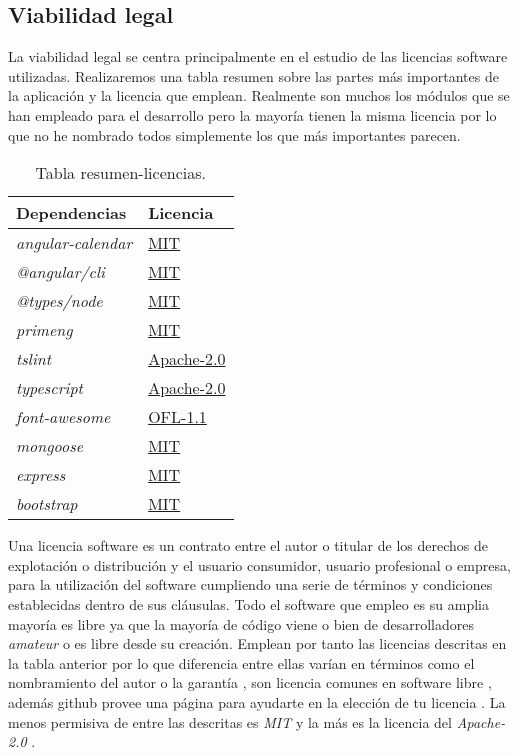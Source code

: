 \subsection{Viabilidad legal}\label{viabilidad-legal}
La viabilidad legal se centra principalmente en el estudio de las licencias software utilizadas. Realizaremos una tabla resumen sobre las partes más importantes de la aplicación y la licencia que emplean. Realmente son muchos los módulos que se han empleado para el desarrollo pero la mayoría tienen la misma licencia por lo que no he nombrado todos simplemente los que más importantes parecen. 

\begin{table}[H]
\begin{center}
\begin{tabular}{|l|l|}
\hline
Dependencias & Licencia \\
\hline \hline
\emph{angular-calendar} & \href{https://opensource.org/licenses/MIT}{MIT}\\ \hline
\emph{@angular/cli} & \href{https://opensource.org/licenses/MIT}{MIT}\\ \hline
\emph{@types/node} & \href{https://opensource.org/licenses/MIT}{MIT}\\ \hline
\emph{primeng} & \href{https://opensource.org/licenses/MIT}{MIT}\\ \hline
\emph{tslint} & \href{https://opensource.org/licenses/Apache-2.0}{Apache-2.0}\\ \hline
\emph{typescript} & \href{https://opensource.org/licenses/Apache-2.0}{Apache-2.0}\\ \hline
\emph{font-awesome} & \href{https://opensource.org/licenses/OFL-1.1}{OFL-1.1}\\ \hline
\emph{mongoose} & \href{https://opensource.org/licenses/MIT}{MIT}\\ \hline
\emph{express} & \href{https://opensource.org/licenses/MIT}{MIT}\\ \hline
\emph{bootstrap} & \href{https://opensource.org/licenses/MIT}{MIT}\\ \hline

\end{tabular}
\caption{Tabla resumen-licencias.}
\label{tabla:licencias}
\end{center}
\end{table}



Una licencia software es un contrato entre el autor o titular de los derechos de explotación o distribución y el usuario consumidor, usuario profesional o empresa, para la utilización del software cumpliendo una serie de términos y condiciones establecidas dentro de sus cláusulas. Todo el software que empleo es su amplia mayoría es libre ya que la mayoría de código viene o bien de desarrolladores \emph{amateur} o es libre desde su creación. Emplean por tanto las licencias descritas en la tabla anterior por lo que diferencia entre ellas varían en términos como el nombramiento del autor o la garantía , son licencia comunes en software libre \cite{githublicense} , además github provee una página para ayudarte en la elección de tu licencia \citep{githubchoose}. La menos permisiva de entre las descritas es \emph{MIT} \citep{mit}  y la más es la licencia del  \emph{Apache-2.0} \cite{apache}.

